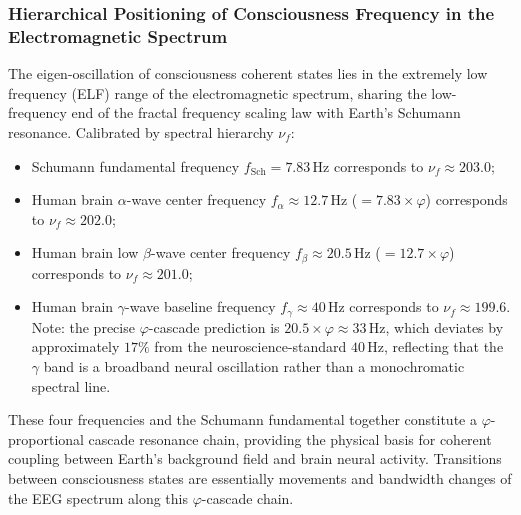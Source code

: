 \documentclass[12pt,a4paper,twocolumn]{article}
\renewcommand{\phi}{\varphi}
\begin{document}
\subsubsection{Hierarchical Positioning of Consciousness Frequency in the Electromagnetic Spectrum}
\label{subsec:consciousness_em_spectrum}
The eigen-oscillation of consciousness coherent states lies in the extremely low frequency (ELF) range of the electromagnetic spectrum, sharing the low-frequency end of the fractal frequency scaling law with Earth's Schumann resonance. Calibrated by spectral hierarchy $\nu_f$:
\begin{itemize}
\item Schumann fundamental frequency $f_{\text{Sch}} = 7.83$\,Hz corresponds to $\nu_f \approx 203.0$;
\item Human brain $\alpha$-wave center frequency $f_\alpha \approx 12.7$\,Hz ($= 7.83 \times \phi$) corresponds to $\nu_f \approx 202.0$;
\item Human brain low $\beta$-wave center frequency $f_\beta \approx 20.5$\,Hz ($= 12.7 \times \phi$) corresponds to $\nu_f \approx 201.0$;
\item Human brain $\gamma$-wave baseline frequency $f_\gamma \approx 40$\,Hz corresponds to $\nu_f \approx 199.6$. Note: the precise $\phi$-cascade prediction is $20.5 \times \phi \approx 33$\,Hz, which deviates by approximately $17\%$ from the neuroscience-standard $40$\,Hz, reflecting that the $\gamma$ band is a broadband neural oscillation rather than a monochromatic spectral line.
\end{itemize}
These four frequencies and the Schumann fundamental together constitute a $\phi$-proportional cascade resonance chain, providing the physical basis for coherent coupling between Earth's background field and brain neural activity. Transitions between consciousness states are essentially movements and bandwidth changes of the EEG spectrum along this $\phi$-cascade chain.
\end{document}
